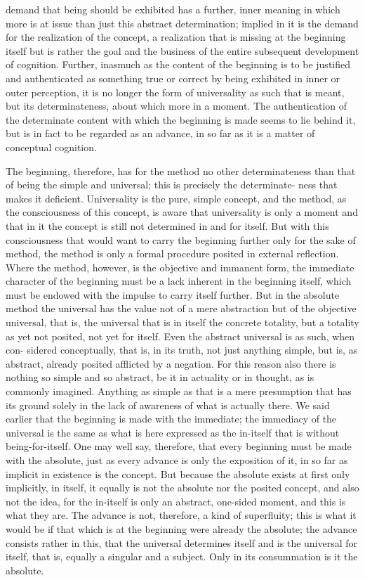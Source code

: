 demand that being should be exhibited has a further, inner meaning in
which more is at issue than just this abstract determination; implied in it
is the demand for the realization of the concept, a realization that is missing
at the beginning itself but is rather the goal and the business of the entire
subsequent development of cognition. Further, inasmuch as the content
of the beginning is to be justified and authenticated as something true or
correct by being exhibited in inner or outer perception, it is no longer
the form of universality as such that is meant, but its determinateness,
about which more in a moment. The authentication of the determinate
content with which the beginning is made seems to lie behind it, but is in
fact to be regarded as an advance, in so far as it is a matter of conceptual
cognition.

The beginning, therefore, has for the method no other determinateness
than that of being the simple and universal; this is precisely the determinate-
ness that makes it deficient. Universality is the pure, simple concept, and
the method, as the consciousness of this concept, is aware that universality
is only a moment and that in it the concept is still not determined in and for
itself. But with this consciousness that would want to carry the beginning
further only for the sake of method, the method is only a formal procedure
posited in external reflection. Where the method, however, is the objective
and immanent form, the immediate character of the beginning must be
a lack inherent in the beginning itself, which must be endowed with the
impulse to carry itself further. But in the absolute method the universal
has the value not of a mere abstraction but of the objective universal, that
is, the universal that is in itself the concrete totality, but a totality as yet not
posited, not yet for itself. Even the abstract universal is as such, when con-
sidered conceptually, that is, in its truth, not just anything simple, but is,
as abstract, already posited afflicted by a negation. For this reason also there
is nothing so simple and so abstract, be it in actuality or in thought, as is
commonly imagined. Anything as simple as that is a mere presumption that
has its ground solely in the lack of awareness of what is actually there.
 We
said earlier that the beginning is made with the immediate; the immediacy
of the universal is the same as what is here expressed as the in-itself that is
without being-for-itself.
 One may well say, therefore, that every beginning
must be made with the absolute, just as every advance is only the exposition
of it, in so far as implicit in existence is the concept. But because the
absolute exists at first only implicitly, in itself, it equally is not the absolute
nor the posited concept, and also not the idea, for the in-itself is only an
abstract, one-sided moment, and this is what they are. The advance is not,
therefore, a kind of superfluity; this is what it would be if that which is
at the beginning were already the absolute; the advance consists rather in
this, that the universal determines itself and is the universal for itself, that
is, equally a singular and a subject. Only in its consummation is it the
absolute.

